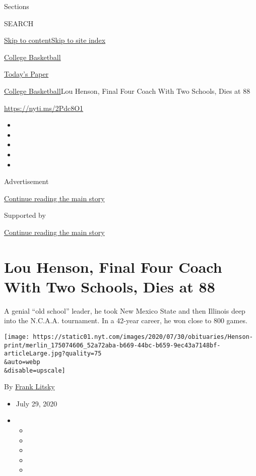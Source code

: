 Sections

SEARCH

\protect\hyperlink{site-content}{Skip to
content}\protect\hyperlink{site-index}{Skip to site index}

\href{https://www.nytimes.com/section/sports/ncaabasketball}{College
Basketball}

\href{https://myaccount.nytimes.com/auth/login?response_type=cookie\&client_id=vi}{}

\href{https://www.nytimes.com/section/todayspaper}{Today's Paper}

\href{/section/sports/ncaabasketball}{College Basketball}\textbar{}Lou
Henson, Final Four Coach With Two Schools, Dies at 88

\url{https://nyti.ms/2Pdc8O1}

\begin{itemize}
\item
\item
\item
\item
\item
\end{itemize}

Advertisement

\protect\hyperlink{after-top}{Continue reading the main story}

Supported by

\protect\hyperlink{after-sponsor}{Continue reading the main story}

\hypertarget{lou-henson-final-four-coach-with-two-schools-dies-at-88}{%
\section{Lou Henson, Final Four Coach With Two Schools, Dies at
88}\label{lou-henson-final-four-coach-with-two-schools-dies-at-88}}

A genial ``old school'' leader, he took New Mexico State and then
Illinois deep into the N.C.A.A. tournament. In a 42-year career, he won
close to 800 games.

\texttt{[image: https://static01.nyt.com/images/2020/07/30/obituaries/Henson-print/merlin\_175074606\_52a72aba-b669-44bc-b659-9ec43a7148bf-articleLarge.jpg?quality=75\\\&auto=webp\\\&disable=upscale]}

By \href{https://www.nytimes.com/by/frank-litsky}{Frank Litsky}

\begin{itemize}
\item
  July 29, 2020
\item
  \begin{itemize}
  \item
  \item
  \item
  \item
  \item
  \end{itemize}
\end{itemize}

